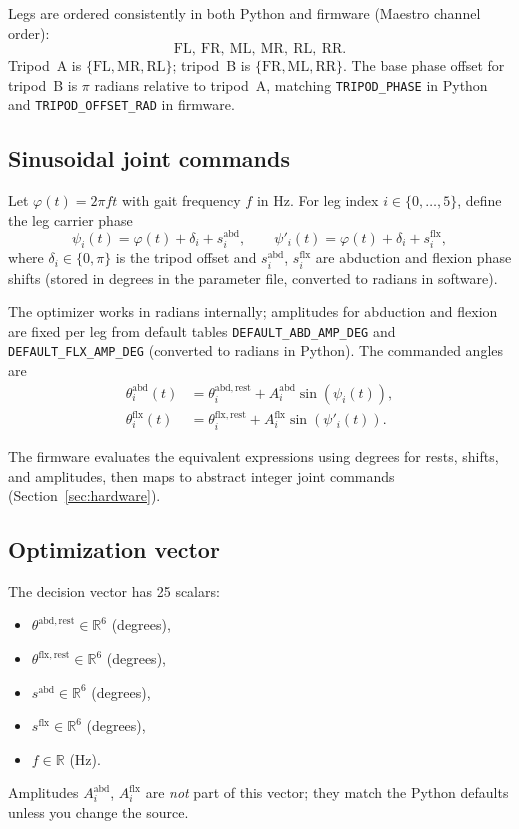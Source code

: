 \documentclass[11pt]{article}
\begin{document}
Legs are ordered consistently in both Python and firmware (Maestro channel order):
\[
\text{FL},\ \text{FR},\ \text{ML},\ \text{MR},\ \text{RL},\ \text{RR}.
\]
Tripod~A is $\{\mathrm{FL},\mathrm{MR},\mathrm{RL}\}$; tripod~B is $\{\mathrm{FR},\mathrm{ML},\mathrm{RR}\}$. The base phase offset for tripod~B is $\pi$ radians relative to tripod~A, matching \texttt{TRIPOD\_PHASE} in Python and \texttt{TRIPOD\_OFFSET\_RAD} in firmware.

\subsection{Sinusoidal joint commands}

Let $\varphi(t) = 2\pi f t$ with gait frequency $f$ in Hz. For leg index $i \in \{0,\ldots,5\}$, define the leg carrier phase
\[
\psi_i(t) = \varphi(t) + \delta_i + s^{\mathrm{abd}}_i,\qquad
\psi'_i(t) = \varphi(t) + \delta_i + s^{\mathrm{flx}}_i,
\]
where $\delta_i \in \{0,\pi\}$ is the tripod offset and $s^{\mathrm{abd}}_i$, $s^{\mathrm{flx}}_i$ are abduction and flexion phase shifts (stored in degrees in the parameter file, converted to radians in software).

The optimizer works in radians internally; amplitudes for abduction and flexion are fixed per leg from default tables \texttt{DEFAULT\_ABD\_AMP\_DEG} and \texttt{DEFAULT\_FLX\_AMP\_DEG} (converted to radians in Python). The commanded angles are
\begin{align}
\theta^{\mathrm{abd}}_i(t) &= \theta^{\mathrm{abd,rest}}_i + A^{\mathrm{abd}}_i \sin(\psi_i(t)), \\
\theta^{\mathrm{flx}}_i(t) &= \theta^{\mathrm{flx,rest}}_i + A^{\mathrm{flx}}_i \sin(\psi'_i(t)).
\end{align}

The firmware evaluates the equivalent expressions using degrees for rests, shifts, and amplitudes, then maps to abstract integer joint commands (Section~\ref{sec:hardware}).

\subsection{Optimization vector}

The decision vector has 25 scalars:
\begin{itemize}
    \item $\theta^{\mathrm{abd,rest}} \in \mathbb{R}^6$ (degrees),
    \item $\theta^{\mathrm{flx,rest}} \in \mathbb{R}^6$ (degrees),
    \item $s^{\mathrm{abd}} \in \mathbb{R}^6$ (degrees),
    \item $s^{\mathrm{flx}} \in \mathbb{R}^6$ (degrees),
    \item $f \in \mathbb{R}$ (Hz).
\end{itemize}
Amplitudes $A^{\mathrm{abd}}_i$, $A^{\mathrm{flx}}_i$ are \emph{not} part of this vector; they match the Python defaults unless you change the source.
\end{document}
